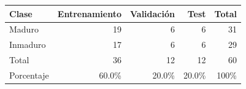 \small
\begin{tabular}{lrrr|r}
\toprule
Clase & Entrenamiento & Validación & Test & Total \\
\midrule
Maduro & 19 & 6 & 6 & 31 \\
Inmaduro & 17 & 6 & 6 & 29 \\
\midrule
Total & 36 & 12 & 12 & 60 \\
Porcentaje & 60.0\% & 20.0\% & 20.0\% & 100\% \\
\bottomrule
\end{tabular}
